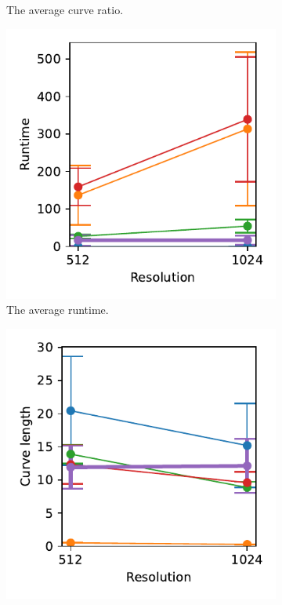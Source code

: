 \begin{figure}[h]
\begin{subfigure}{.3\textwidth}
    \caption{The average curve ratio.}
\end{subfigure}
    \begin{subfigure}{.3\textwidth}
    \centering
    \includegraphics[width=\textwidth]{graphics/eval/runtime_1024-1.024_True_sketchbench.pdf}
    \caption{The average runtime.}
\end{subfigure}
    \begin{subfigure}{.3\textwidth}
    \centering
    \includegraphics[width=\textwidth]{graphics/eval/curve length_1024-1.024_True_sketchbench.pdf}

\end{subfigure}
\end{figure}
